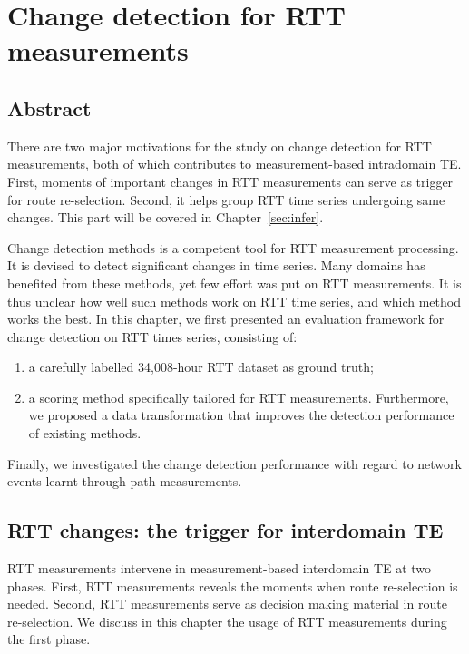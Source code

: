 \chapter{Change detection for RTT measurements}
\label{sec:cpt_rtt}

\section*{Abstract}
There are two major motivations for the study on change detection for \ac{RTT} measurements, both of which contributes to measurement-based intradomain \ac{TE}.
First, moments of important changes in RTT measurements can serve as trigger for route re-selection.
Second, it helps group RTT time series undergoing same changes.
This part will be covered in Chapter~\ref{sec:infer}.


Change detection methods is a competent tool for RTT measurement processing.
It is devised to detect significant changes in time series.
Many domains has benefited from these methods, yet few effort was put on RTT measurements. 
It is thus unclear how well such methods work on RTT time series, and which method works the best. 
In this chapter, we first presented an evaluation framework for change detection on RTT times series, consisting of:
\begin{enumerate}
	\item a carefully labelled 34,008-hour RTT dataset as ground truth;
	\item a scoring method specifically tailored for RTT measurements.
Furthermore, we proposed a data transformation that improves the detection performance of existing methods.
\end{enumerate}
Finally, we investigated the change detection performance with regard to network events learnt through path measurements.
\clearpage


\section{RTT changes: the trigger for interdomain TE}
RTT measurements intervene in measurement-based interdomain TE at two phases. 
First, RTT measurements reveals the moments when route re-selection is needed. %
Second, RTT measurements serve as decision making material in route re-selection. %
We discuss in this chapter the usage of RTT measurements during the first phase.

